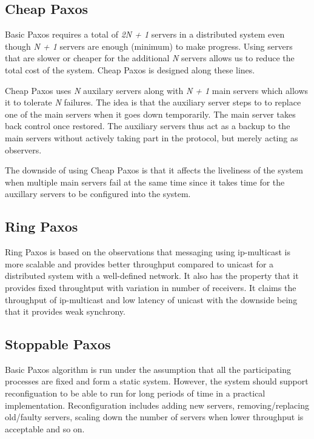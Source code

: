 \subsection{Cheap Paxos}

Basic Paxos requires a total of \emph{2N + 1} servers in a distributed system 
even though \emph{N + 1} servers are enough (minimum) to make progress. 
Using servers that are slower or cheaper for the additional \emph{N} servers
allows us to reduce the total cost of the system. Cheap Paxos is designed along 
these lines.

Cheap Paxos uses \emph{N} auxilary servers along with \emph{N + 1} main servers
which allows it to tolerate \emph{N} failures. The idea is that the auxiliary
server steps to to replace one of the main servers when it goes down 
temporarily. The main server takes back control once restored. The auxiliary
servers thus act as a backup to the main servers without actively taking part
in the protocol, but merely acting as observers.

The downside of using Cheap Paxos is that it affects the liveliness of the 
system when multiple main servers fail at the same time since it takes time
for the auxillary servers to be configured into the system.

\subsection{Ring Paxos}

Ring Paxos \citep{MarandiPSP10} is based on the observations that messaging
using ip-multicast is more scalable and provides better throughput compared
to unicast for a distributed system with a well-defined network. It also
has the property that it provides fixed throughtput with variation in number
of receivers. It claims the throughput of ip-multicast and low latency of
unicast with the downside being that it provides weak synchrony.

\subsection{Stoppable Paxos}

Basic Paxos algorithm is run under the assumption that all the participating
processes are fixed and form a static system. However, the system should
support reconfiguation to be able to run for long periods of time in a
practical implementation. Reconfiguration includes adding new servers, 
removing/replacing old/faulty servers, scaling down the number of servers
when lower throughput is acceptable and so on.

